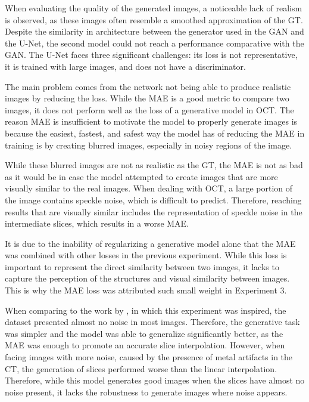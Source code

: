 When evaluating the quality of the generated images, a noticeable lack of realism is observed, as these images often resemble a smoothed approximation of the GT. Despite the similarity in architecture between the generator used in the GAN and the U-Net, the second model could not reach a performance comparative with the GAN. The U-Net faces three significant challenges: its loss is not representative, it is trained with large images, and does not have a discriminator.
\par
The main problem comes from the network not being able to produce realistic images by reducing the loss. While the MAE is a good metric to compare two images, it does not perform well as the loss of a generative model in OCT. The reason MAE is insufficient to motivate the model to properly generate images is because the easiest, fastest, and safest way the model has of reducing the MAE in training is by creating blurred images, especially in noisy regions of the image.
\par
While these blurred images are not as realistic as the GT, the MAE is not as bad as it would be in case the model attempted to create images that are more visually similar to the real images. When dealing with OCT, a large portion of the image contains speckle noise, which is difficult to predict. Therefore, reaching results that are visually similar includes the representation of speckle noise in the intermediate slices, which results in a worse MAE.
\par
It is due to the inability of regularizing a generative model alone that the MAE was combined with other losses in the previous experiment. While this loss is important to represent the direct similarity between two images, it lacks to capture the perception of the structures and visual similarity between images. This is why the MAE loss was attributed such small weight in Experiment 3.
\par
When comparing to the work by \textcite{Nishimoto2024}, in which this experiment was inspired, the dataset presented almost no noise in most images. Therefore, the generative task was simpler and the model was able to generalize significantly better, as the MAE was enough to promote an accurate slice interpolation. However, when facing images with more noise, caused by the presence of metal artifacts in the CT, the generation of slices performed worse than the linear interpolation. Therefore, while this model generates good images when the slices have almost no noise present, it lacks the robustness to generate images where noise appears.
